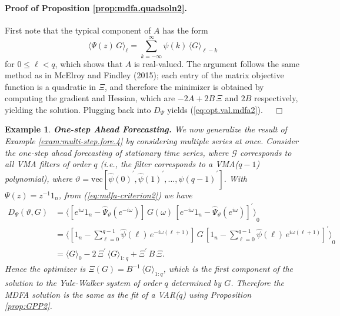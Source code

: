 \documentclass[a4paper]{book}
\newtheorem{Example}{Example}
\begin{document}
\paragraph{Proof of Proposition \ref{prop:mdfa.quadsoln2}.}
 First note that the typical component of $A$ has the form
\begin{equation}
 \label{eq:psi.g.comp2}
   { \langle \Psi (z) \, G \rangle }_{\ell} = \sum_{k = - \infty}^{\infty} \psi (k) \,
	 { \langle G \rangle }_{\ell-k}
\end{equation}
 for $0 \leq \ell < q$,  which shows that $A$ is real-valued. 
 The argument follows the same method as in McElroy and Findley (2015);
 each entry of the matrix objective function is a quadratic in $\Xi$, and therefore
  the minimizer is obtained 
 by computing the gradient and Hessian, which are 
  $-2 A + 2 B \, \Xi$ and   $2 B$ respectively,
  yielding the solution.  Plugging back into $D_{\Psi}$ yields (\ref{eq:opt.val.mdfa2}).
$\quad \Box$


 
\begin{Example} {\bf One-step Ahead Forecasting.}  \rm
\label{exam:multi-step.fore.4-alt}
 We now generalize the result of Example \ref{exam:multi-step.fore.4} by considering
  multiple series at once.   Consider the   one-step ahead forecasting of 
  stationary time series, where 
 $\mathcal{G} $ corresponds to   all VMA filters of   order $q$
  (i.e., the filter corresponds to a VMA($q-1$) polynomial), where  
 $ \vartheta  = \mbox{vec} [{\widehat{\psi} (0) }^{\prime},
 {\widehat{\psi} (1) }^{\prime},   \ldots,
  {\widehat{\psi} (q-1) }^{\prime} ]$.
 With $\Psi (z) = z^{-1} 1_n$, from (\ref{eq:mdfa-criterion2}) we have 
\begin{align*}
 D_{\Psi} (\vartheta, G) & = 
 { \langle  \left[  e^{i \omega} 1_n -  \widehat{\Psi}_{\vartheta} (e^{-i \omega}) \right] \,   G (\omega) \,
  {  \left[ e^{-i \omega}  1_n  -  \widehat{\Psi}_{\vartheta} (e^{i \omega}) \right] }^{\prime} \rangle }_0 \\
 & = { \langle  \left[ 1_n -  \sum_{\ell = 0}^{q-1} \widehat{\psi} (\ell)
    \, e^{-i \omega  (\ell+1) } \right] \, 
  G \,   {  \left[ 1_n  -   \sum_{\ell = 0}^{q-1} \widehat{\psi} (\ell) 
  \, e^{i \omega (\ell+1 ) } \right]
  }^{\prime} \rangle }_0 \\
 & = { \langle G \rangle }_0 - 2 \, \Xi^{\prime} \, { \langle G \rangle }_{1:q} 
    + \Xi^{\prime} \, B \, \Xi.
\end{align*}
 Hence the  optimizer is   $ \Xi (G) = B^{-1} \,    { \langle G \rangle }_{1:q}$,
 which is the first component of the solution to the Yule-Walker system of order 
  $q$ determined by $G$.
  Therefore the MDFA solution is the same as the fit of a VAR($q$) using 
 Proposition \ref{prop:GPP2}.
\end{Example}
 
\end{document}
